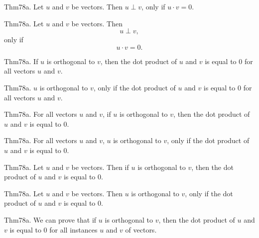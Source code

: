 \documentclass{article}
\begin{document}
Thm78a. Let $u$ and $v$ be vectors. Then $u \perp v$, only if $u \cdot v = 0$.

Thm78a. Let $u$ and $v$ be vectors. Then $$u \perp v,$$ only if $$u \cdot v = 0.$$

Thm78a. If $u$ is orthogonal to $v$, then the dot product of $u$ and $v$ is equal to $0$ for all vectors $u$ and $v$.

Thm78a. $u$ is orthogonal to $v$, only if the dot product of $u$ and $v$ is equal to $0$ for all vectors $u$ and $v$.

Thm78a. For all vectors $u$ and $v$, if $u$ is orthogonal to $v$, then the dot product of $u$ and $v$ is equal to $0$.

Thm78a. For all vectors $u$ and $v$, $u$ is orthogonal to $v$, only if the dot product of $u$ and $v$ is equal to $0$.

Thm78a. Let $u$ and $v$ be vectors. Then if $u$ is orthogonal to $v$, then the dot product of $u$ and $v$ is equal to $0$.

Thm78a. Let $u$ and $v$ be vectors. Then $u$ is orthogonal to $v$, only if the dot product of $u$ and $v$ is equal to $0$.

Thm78a. We can prove that if $u$ is orthogonal to $v$, then the dot product of $u$ and $v$ is equal to $0$ for all instances $u$ and $v$ of vectors.
\end{document}
